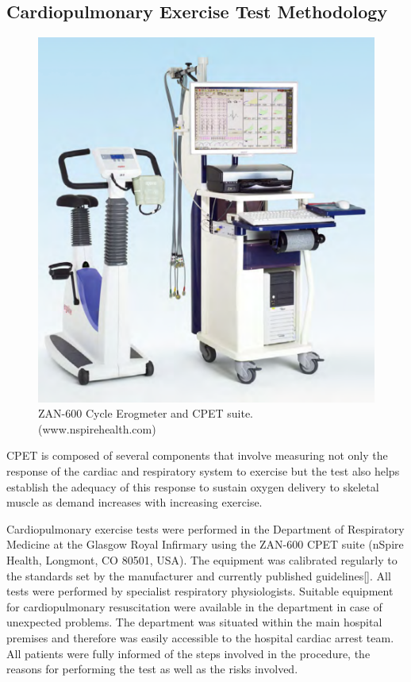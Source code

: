 \subsection{Cardiopulmonary Exercise Test Methodology}
\label{sec:cpx_method}

\begin{figure}[htbp]
	\centering
	\includegraphics[width=\textwidth]{Figures/cpet-zan}
	\caption{ZAN-600 Cycle Erogmeter and CPET suite. (www.nspirehealth.com)}
	\label{fig:cpet-zan}
\end{figure}

CPET is composed of several components that involve measuring not only the response of the cardiac and respiratory system to exercise but the test also helps establish the adequacy of this response to sustain oxygen delivery to skeletal muscle as demand increases with increasing exercise. 

Cardiopulmonary exercise tests were performed in the Department of Respiratory Medicine at the Glasgow Royal Infirmary using the ZAN-600 CPET suite (nSpire Health, Longmont, CO 80501, USA). 
The equipment was calibrated regularly to the standards set by the manufacturer and currently published guidelines[]. 
All tests were performed by specialist respiratory physiologists. 
Suitable equipment for cardiopulmonary resuscitation were available in the department in case of unexpected problems. 
The department was situated within the main hospital premises and therefore was easily accessible to the hospital cardiac arrest team. 
All patients were fully informed of the steps involved in the procedure, the reasons for performing the test as well as the risks involved. 

